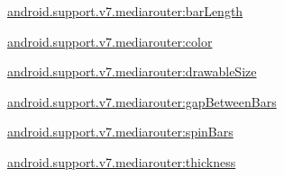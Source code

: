 {\ttfamily \hyperlink{classandroid_1_1support_1_1v7_1_1mediarouter_1_1R_1_1styleable_a2324cb3e0816358e8359cc591b432f3e}{android.\+support.\+v7.\+mediarouter\+:bar\+Length}}

{\ttfamily \hyperlink{classandroid_1_1support_1_1v7_1_1mediarouter_1_1R_1_1styleable_a8bd8d9885033bad0fe40599a324d5680}{android.\+support.\+v7.\+mediarouter\+:color}}

{\ttfamily \hyperlink{classandroid_1_1support_1_1v7_1_1mediarouter_1_1R_1_1styleable_a3312cfca0f8aa8b24370e5800a56eead}{android.\+support.\+v7.\+mediarouter\+:drawable\+Size}}

{\ttfamily \hyperlink{classandroid_1_1support_1_1v7_1_1mediarouter_1_1R_1_1styleable_a9ab9b13a15b2523a68b1fd3f98d047be}{android.\+support.\+v7.\+mediarouter\+:gap\+Between\+Bars}}

{\ttfamily \hyperlink{classandroid_1_1support_1_1v7_1_1mediarouter_1_1R_1_1styleable_aae8cdc41456778b50a759a297ff28dad}{android.\+support.\+v7.\+mediarouter\+:spin\+Bars}}

{\ttfamily \hyperlink{classandroid_1_1support_1_1v7_1_1mediarouter_1_1R_1_1styleable_afe1e37e12d66a5326cf5638f522e86fd}{android.\+support.\+v7.\+mediarouter\+:thickness}}

